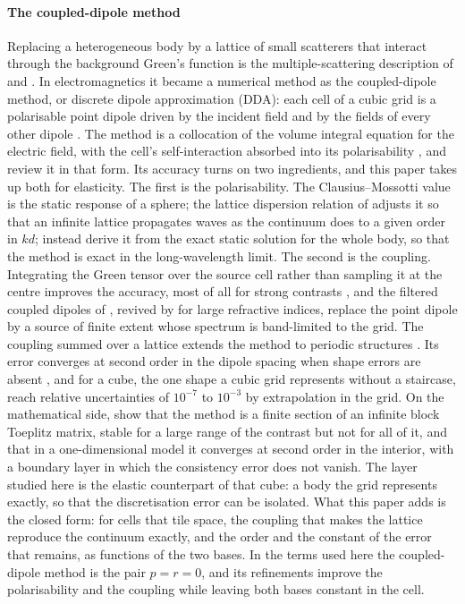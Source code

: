 \documentclass[preprint,review,12pt]{elsarticle}
\begin{document}
\paragraph{The coupled-dipole method} Replacing a heterogeneous body by a lattice of small
scatterers that interact through the background Green's function is the multiple-scattering
description of \citet{Foldy1945} and \citet{Lax1951}. In electromagnetics it became a numerical
method as the coupled-dipole method, or discrete dipole approximation (DDA): each cell of a cubic
grid is a polarisable point dipole driven by the incident field and by the fields of every other
dipole \citep{Purcell1973,Draine1994}. The method is a collocation of the volume integral equation
for the electric field, with the cell's self-interaction absorbed into its polarisability
\citep{Lakhtakia1992}, and \citet{YurkinHoekstra2007} review it in that form. Its accuracy turns on
two ingredients, and this paper takes up both for elasticity. The first is the polarisability. The
Clausius--Mossotti value is the static response of a sphere; the lattice dispersion relation of
\citet{Draine1993} adjusts it so that an infinite lattice propagates waves as the continuum does to
a given order in $kd$; \citet{Rahmani2002} instead derive it from the exact static solution for the
whole body, so that the method is exact in the long-wavelength limit. The second is the coupling.
Integrating the Green tensor over the source cell rather than sampling it at the centre improves the
accuracy, most of all for strong contrasts \citep{Chaumet2004}, and the filtered coupled dipoles of
\citet{Piller1998}, revived by \citet{Yurkin2010} for large refractive indices, replace the point
dipole by a source of finite extent whose spectrum is band-limited to the grid. The coupling summed
over a lattice extends the method to periodic structures \citep{Chaumet2003}. Its error converges
at second order in the dipole spacing when shape errors are absent \citep{Yurkin2006}, and for a
cube, the one shape a cubic grid represents without a staircase, \citet{YurkinKahnert2013} reach
relative uncertainties of $10^{-7}$ to $10^{-3}$ by extrapolation in the grid. On the mathematical
side, \citet{Costabel2023} show that the method is a finite section of an infinite block Toeplitz
matrix, stable for a large range of the contrast but not for all of it, and \citet{Costabel2023Hilbert}
that in a one-dimensional model it converges at second order in the interior, with a boundary layer in
which the consistency error does not vanish. The layer studied
here is the elastic counterpart of that cube: a body the grid represents exactly, so that the
discretisation error can be isolated. What this paper adds is the closed form: for cells that tile
space, the coupling that makes the lattice reproduce the continuum exactly, and the order and the
constant of the error that remains, as functions of the two bases. In the terms used here the
coupled-dipole method is the pair $p=r=0$, and its refinements improve the polarisability and the
coupling while leaving both bases constant in the cell.
\end{document}
